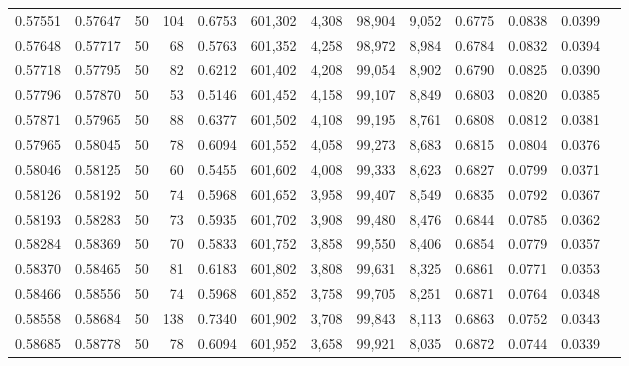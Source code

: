 \begin{tabular}{rrrrrrrrrrrrr}
0.57551 & 0.57647 &    50 & 104 &                                     0.6753 & 601,302 &   4,308 &  98,904 &   9,052 & 0.6775 & 0.0838 & 0.0399 \\
0.57648 & 0.57717 &    50 &  68 &                                     0.5763 & 601,352 &   4,258 &  98,972 &   8,984 & 0.6784 & 0.0832 & 0.0394 \\
0.57718 & 0.57795 &    50 &  82 &                                     0.6212 & 601,402 &   4,208 &  99,054 &   8,902 & 0.6790 & 0.0825 & 0.0390 \\
0.57796 & 0.57870 &    50 &  53 &                                     0.5146 & 601,452 &   4,158 &  99,107 &   8,849 & 0.6803 & 0.0820 & 0.0385 \\
0.57871 & 0.57965 &    50 &  88 &                                     0.6377 & 601,502 &   4,108 &  99,195 &   8,761 & 0.6808 & 0.0812 & 0.0381 \\
0.57965 & 0.58045 &    50 &  78 &                                     0.6094 & 601,552 &   4,058 &  99,273 &   8,683 & 0.6815 & 0.0804 & 0.0376 \\
0.58046 & 0.58125 &    50 &  60 &                                     0.5455 & 601,602 &   4,008 &  99,333 &   8,623 & 0.6827 & 0.0799 & 0.0371 \\
0.58126 & 0.58192 &    50 &  74 &                                     0.5968 & 601,652 &   3,958 &  99,407 &   8,549 & 0.6835 & 0.0792 & 0.0367 \\
0.58193 & 0.58283 &    50 &  73 &                                     0.5935 & 601,702 &   3,908 &  99,480 &   8,476 & 0.6844 & 0.0785 & 0.0362 \\
0.58284 & 0.58369 &    50 &  70 &                                     0.5833 & 601,752 &   3,858 &  99,550 &   8,406 & 0.6854 & 0.0779 & 0.0357 \\
0.58370 & 0.58465 &    50 &  81 &                                     0.6183 & 601,802 &   3,808 &  99,631 &   8,325 & 0.6861 & 0.0771 & 0.0353 \\
0.58466 & 0.58556 &    50 &  74 &                                     0.5968 & 601,852 &   3,758 &  99,705 &   8,251 & 0.6871 & 0.0764 & 0.0348 \\
0.58558 & 0.58684 &    50 & 138 &                                     0.7340 & 601,902 &   3,708 &  99,843 &   8,113 & 0.6863 & 0.0752 & 0.0343 \\
0.58685 & 0.58778 &    50 &  78 &                                     0.6094 & 601,952 &   3,658 &  99,921 &   8,035 & 0.6872 & 0.0744 & 0.0339 \\

\end{tabular}
